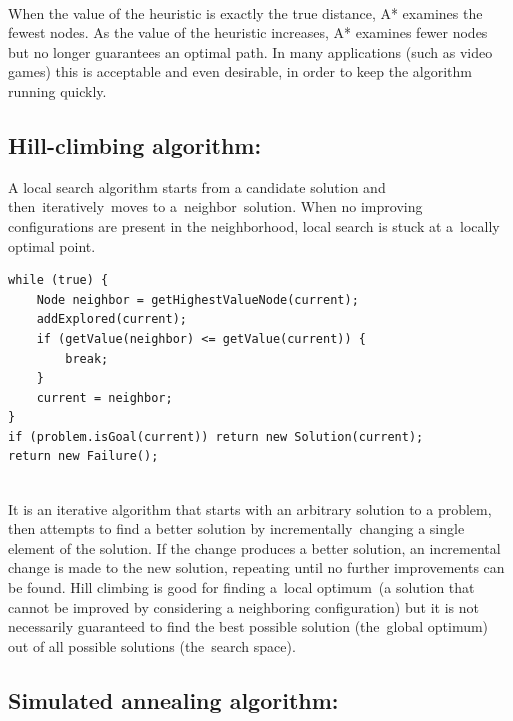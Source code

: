 \documentclass[a4paper]{article}
\begin{document}
\noindent \\
When the value of the heuristic is exactly the true distance, A* examines the fewest nodes. As the value of the heuristic increases, A* examines fewer nodes but no longer guarantees an optimal path. In many applications (such as video games) this is acceptable and even desirable, in order to keep the algorithm running quickly.


\subsection{Hill-climbing algorithm:}

A local search algorithm starts from a candidate solution and then iteratively moves to a neighbor solution. When no improving configurations are present in the neighborhood, local search is stuck at a locally optimal point.

\begin{lstlisting}
while (true) {
    Node neighbor = getHighestValueNode(current);
    addExplored(current);
    if (getValue(neighbor) <= getValue(current)) {
        break;
    }
    current = neighbor;
}
if (problem.isGoal(current)) return new Solution(current);
return new Failure();
\end{lstlisting}

\noindent \\
It is an iterative algorithm that starts with an arbitrary solution to a problem, then attempts to find a better solution by incrementally changing a single element of the solution. If the change produces a better solution, an incremental change is made to the new solution, repeating until no further improvements can be found. Hill climbing is good for finding a local optimum (a solution that cannot be improved by considering a neighboring configuration) but it is not necessarily guaranteed to find the best possible solution (the global optimum) out of all possible solutions (the search space).


\subsection{Simulated annealing algorithm:}
\end{document}
